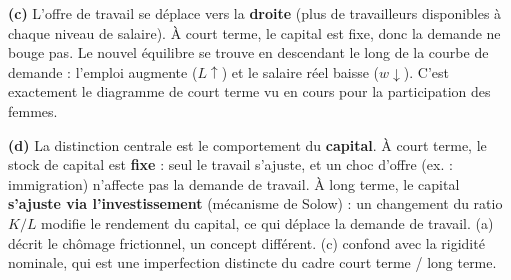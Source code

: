 
\begin{reponse}
\textbf{(c)} L'offre de travail se déplace vers la \textbf{droite} (plus de travailleurs disponibles à chaque niveau de salaire). À court terme, le capital est fixe, donc la demande ne bouge pas. Le nouvel équilibre se trouve en descendant le long de la courbe de demande : l'emploi augmente ($L \uparrow$) et le salaire réel baisse ($w \downarrow$). C'est exactement le diagramme de court terme vu en cours pour la participation des femmes.
\end{reponse}


\begin{reponse}
\textbf{(d)} La distinction centrale est le comportement du \textbf{capital}. À court terme, le stock de capital est \textbf{fixe} : seul le travail s'ajuste, et un choc d'offre (ex. : immigration) n'affecte pas la demande de travail. À long terme, le capital \textbf{s'ajuste via l'investissement} (mécanisme de Solow) : un changement du ratio $K/L$ modifie le rendement du capital, ce qui déplace la demande de travail. (a) décrit le chômage frictionnel, un concept différent. (c) confond avec la rigidité nominale, qui est une imperfection distincte du cadre court terme / long terme.
\end{reponse}

